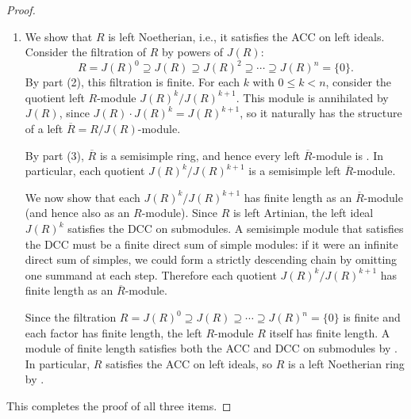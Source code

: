 \begin{proof}
\begin{enumerate}
        Hence $\overline{R}$ is the sum of its minimal left ideals, which means $\overline{R}$ is semisimple as a left module over itself by . Therefore $R/J(R)$ is a semisimple ring.

        \item We show that $R$ is left Noetherian, i.e., it satisfies the ACC on left ideals. Consider the filtration of $R$ by powers of $J(R)$:
        $$R = J(R)^0 \supseteq J(R) \supseteq J(R)^2 \supseteq \cdots \supseteq J(R)^n = \{0\}.$$
        By part (2), this filtration is finite. For each $k$ with $0 \leq k < n$, consider the quotient left $R$-module $J(R)^k / J(R)^{k+1}$. This module is annihilated by $J(R)$, since $J(R) \cdot J(R)^k = J(R)^{k+1}$, so it naturally has the structure of a left $\overline{R} = R/J(R)$-module.

        By part (3), $\overline{R}$ is a semisimple ring, and hence every left $\overline{R}$-module is . In particular, each quotient $J(R)^k / J(R)^{k+1}$ is a semisimple left $\overline{R}$-module.

        We now show that each $J(R)^k / J(R)^{k+1}$ has finite length as an $\overline{R}$-module (and hence also as an $R$-module). Since $R$ is left Artinian, the left ideal $J(R)^k$ satisfies the DCC on submodules. A semisimple module that satisfies the DCC must be a finite direct sum of simple modules: if it were an infinite direct sum of simples, we could form a strictly descending chain by omitting one summand at each step. Therefore each quotient $J(R)^k / J(R)^{k+1}$ has finite length as an $\overline{R}$-module.

        Since the filtration $R = J(R)^0 \supseteq J(R) \supseteq \cdots \supseteq J(R)^n = \{0\}$ is finite and each factor has finite length, the left $R$-module $R$ itself has finite length. A module of finite length satisfies both the ACC and DCC on submodules by . In particular, $R$ satisfies the ACC on left ideals, so $R$ is a left Noetherian ring by .
    \end{enumerate}

    This completes the proof of all three items.
\end{proof}